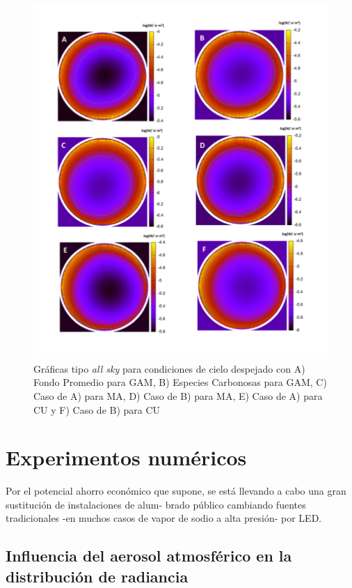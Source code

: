 \begin{figure}[H]
  \centering
    \includegraphics[width=1\textwidth]{1}
  \caption{Gráficas tipo \textit{all sky} para condiciones de cielo despejado con A) Fondo Promedio para GAM, B) Especies Carbonosas para GAM, C) Caso de A) para MA, D) Caso de B) para MA, E) Caso de A) para CU y F) Caso de B) para CU} 
  \label{1}
\end{figure}


\newpage

\section{Experimentos numéricos}

Por el potencial ahorro económico que supone, se está llevando a cabo una gran sustitución de instalaciones de alum-
brado público cambiando fuentes tradicionales -en muchos casos de vapor de sodio a alta presión- por LED.

\newpage

\subsection{Influencia del aerosol atmosférico en la distribución de radiancia}

